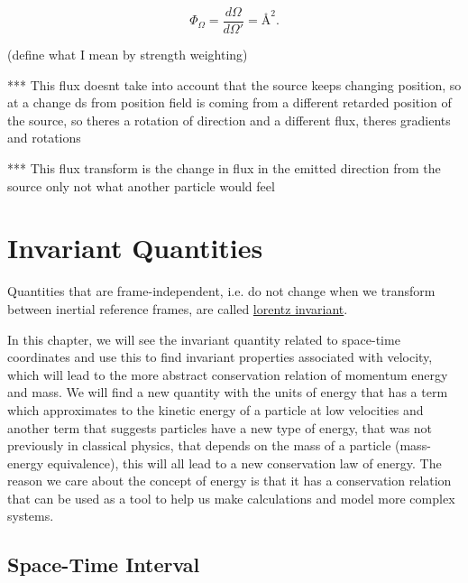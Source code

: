 \begin{equation}
	\label{eq: aberrational wavefront weighting}
	\Phi_\Omega = \frac{d\Omega}{d\Omega'} = \text{\AA}^2.
\end{equation}

(define what I mean by strength weighting)

*** This flux doesnt take into account that the source keeps changing position, so at a change ds from position field is coming from a different retarded position of the source, so theres a rotation of direction and a different flux, theres gradients and rotations

*** This flux transform is the change in flux in the emitted direction from the source only not what another particle would feel

\chapter{Invariant Quantities}

Quantities that are frame-independent, i.e. do not change when we transform between inertial reference frames, are called \hyperlink{def-lorentz-invariant}{lorentz invariant}.

In this chapter, we will see the invariant quantity related to space-time coordinates and use this to find invariant properties associated with velocity, which will lead to the more abstract conservation relation of momentum energy and mass. We will find a new quantity with the units of energy that has a term which approximates to the kinetic energy of a particle at low velocities and another term that suggests particles have a new type of energy, that was not previously in classical physics, that depends on the mass of a particle (mass-energy equivalence), this will all lead to a new conservation law of energy.  The reason we care about the concept of energy is that it has a conservation relation that can be used as a tool to help us make calculations and model more complex systems.

\section{Space-Time Interval}

